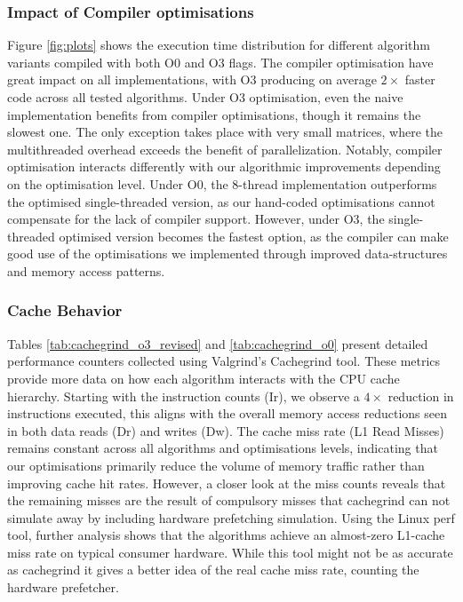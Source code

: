\subsubsection{Impact of Compiler optimisations}\label{sec:compiler_impact}
Figure \ref{fig:plots} shows the execution time distribution for different algorithm variants compiled with both O0 and O3 flags. 
The compiler optimisation have great impact on all implementations, with O3 producing on average $2\times$ faster code across all tested algorithms.
Under O3 optimisation, even the naive implementation benefits from compiler optimisations, though it remains the slowest one. 
The only exception takes place with very small matrices, where the multithreaded overhead exceeds the benefit of parallelization.
Notably, compiler optimisation interacts differently with our algorithmic improvements depending on the optimisation level. 
Under O0, the 8-thread implementation outperforms the optimised single-threaded version, as our hand-coded optimisations cannot compensate for the lack of compiler support. 
However, under O3, the single-threaded optimised version becomes the fastest option, as the compiler can make good use of the optimisations we implemented through improved data-structures and memory access patterns.

\subsubsection{Cache Behavior}\label{sec:cache_beh}
Tables \ref{tab:cachegrind_o3_revised} and \ref{tab:cachegrind_o0} present detailed performance counters collected using Valgrind's Cachegrind tool.
These metrics provide more data on how each algorithm interacts with the CPU cache hierarchy.
Starting with the instruction counts (Ir), we observe a $4\times$ reduction in instructions executed, this aligns with the overall memory access reductions seen in both data reads (Dr) and writes (Dw).
The cache miss rate (L1 Read Misses) remains constant across all algorithms and optimisations levels, indicating that our optimisations primarily reduce the volume of memory traffic rather than improving cache hit rates.
However, a closer look at the miss counts reveals that the remaining misses are the result of compulsory misses that cachegrind can not simulate away by including hardware prefetching simulation.
Using the Linux perf tool, further analysis shows that the algorithms achieve an almost-zero L1-cache miss rate on typical consumer hardware.
While this tool might not be as accurate as cachegrind it gives a better idea of the real cache miss rate, counting the hardware prefetcher.


